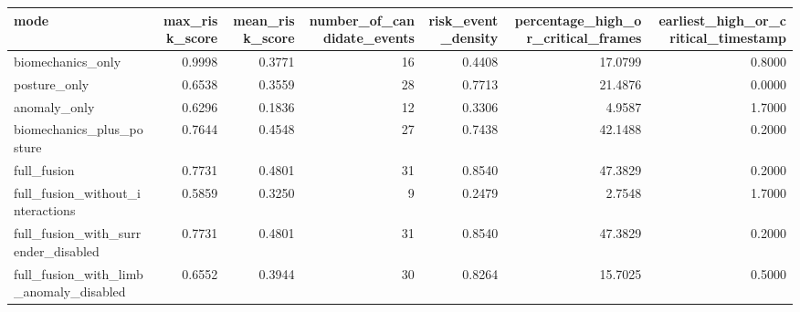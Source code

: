 \begin{tabular}{lrrrrrr}
\toprule
mode & max\_risk\_score & mean\_risk\_score & number\_of\_candidate\_events & risk\_event\_density & percentage\_high\_or\_critical\_frames & earliest\_high\_or\_critical\_timestamp \\
\midrule
biomechanics\_only & 0.9998 & 0.3771 & 16 & 0.4408 & 17.0799 & 0.8000 \\
posture\_only & 0.6538 & 0.3559 & 28 & 0.7713 & 21.4876 & 0.0000 \\
anomaly\_only & 0.6296 & 0.1836 & 12 & 0.3306 & 4.9587 & 1.7000 \\
biomechanics\_plus\_posture & 0.7644 & 0.4548 & 27 & 0.7438 & 42.1488 & 0.2000 \\
full\_fusion & 0.7731 & 0.4801 & 31 & 0.8540 & 47.3829 & 0.2000 \\
full\_fusion\_without\_interactions & 0.5859 & 0.3250 & 9 & 0.2479 & 2.7548 & 1.7000 \\
full\_fusion\_with\_surrender\_disabled & 0.7731 & 0.4801 & 31 & 0.8540 & 47.3829 & 0.2000 \\
full\_fusion\_with\_limb\_anomaly\_disabled & 0.6552 & 0.3944 & 30 & 0.8264 & 15.7025 & 0.5000 \\
\bottomrule
\end{tabular}
